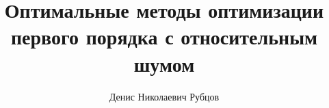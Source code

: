 \documentclass{beamer}
\title[\hbox to 56mm{Оптимальные методы оптимизации первого порядка с относительным шумом}]{Оптимальные методы оптимизации первого порядка с относительным шумом}
\author[Д.\,Н. Рубцов]{Денис Николаевич Рубцов}
\institute{Московский физико-технический институт}
\date{\footnotesize
\par\smallskip\emph{Курс:} Автоматизация научных исследований\par (практика, В.\,В.~Стрижов)/Группа 105
\par\smallskip\emph{Эксперт:} к.ф.-м.н. Э.\,А.~Горбунов
\par\smallskip\emph{Консультант:} Н.\,М.~Корнилов
\par\bigskip\small 2024}
\begin{document}
\begin{frame}
\thispagestyle{empty}
\maketitle
\end{frame}
\end{document}
